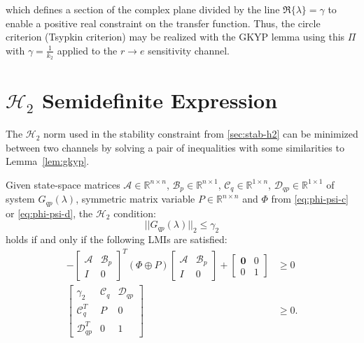 which defines a section of the complex plane divided by the line $\Re{\{\lambda\}} = \gamma$ to enable a positive real constraint on the transfer function. Thus, the circle criterion (Tsypkin criterion) may be realized with the \gls{GKYP} lemma using this $\Pi$ with $\gamma = \frac{1}{k_2}$ applied to the $r \rightarrow e$ sensitivity channel.

\section{$\mathcal{H}_2$ Semidefinite Expression}
\label{sec:opt-h2}

The $\mathcal{H}_2$ norm used in the stability constraint from \autoref{sec:stab-h2} can be minimized between two channels by solving a pair of inequalities with some similarities to Lemma~\ref{lem:gkyp}.

\begin{thm} \label{thm:h2}
	Given state-space matrices $\mathcal{A} \in \mathbb{R}^{n \times n}$, $\mathcal{B}_p \in \mathbb{R}^{n \times 1}$, $\mathcal{C}_q \in \mathbb{R}^{1 \times n}$, $\mathcal{D}_{qp} \in \mathbb{R}^{1 \times 1}$ of system $G_{qp}(\lambda)$, symmetric matrix variable $P \in \mathbb{R}^{n \times n}$ and $\Phi$ from \autoref{eq:phi-psi-c} or \ref{eq:phi-psi-d}, the $\mathcal{H}_2$ condition:
	\begin{equation*}
		||G_{qp}(\lambda)||_2 \leq \gamma_2
	\end{equation*}
	holds if and only if the following \gls{LMI}s are satisfied:
	\begin{align}
		-\begin{bmatrix}
			\mathcal{A} & \mathcal{B}_p \\
			I & 0
		\end{bmatrix}^T
		\left(\Phi \oplus P\right)
		\begin{bmatrix}
			\mathcal{A} & \mathcal{B}_p \\
			I & 0
		\end{bmatrix} +
		\begin{bmatrix}
			\mathbf{0} & 0 \\
			0 & 1
		\end{bmatrix}
		&\geq 0 \label{eq:lmi2-1} \\
		\begin{bmatrix}
			\gamma_2 & \mathcal{C}_q & \mathcal{D}_{qp} \\
			\mathcal{C}_q^T & P & 0 \\
			\mathcal{D}_{qp}^T & 0 & 1
		\end{bmatrix}
		&\geq 0 \label{eq:lmi2-2}.
	\end{align}
\end{thm}


